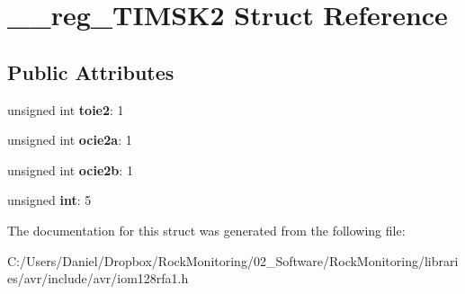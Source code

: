 \hypertarget{struct____reg___t_i_m_s_k2}{}\section{\+\_\+\+\_\+reg\+\_\+\+T\+I\+M\+S\+K2 Struct Reference}
\label{struct____reg___t_i_m_s_k2}
\subsection*{Public Attributes}
\begin{DoxyCompactItemize}
\item 
unsigned int {\bfseries toie2}\+: 1\hypertarget{struct____reg___t_i_m_s_k2_a2cab9bd45bbdc8185ae7580166240124}{}\label{struct____reg___t_i_m_s_k2_a2cab9bd45bbdc8185ae7580166240124}

\item 
unsigned int {\bfseries ocie2a}\+: 1\hypertarget{struct____reg___t_i_m_s_k2_ab5078ad6c4f52deadc17a3c3cb8931c6}{}\label{struct____reg___t_i_m_s_k2_ab5078ad6c4f52deadc17a3c3cb8931c6}

\item 
unsigned int {\bfseries ocie2b}\+: 1\hypertarget{struct____reg___t_i_m_s_k2_af2c60271b7ecfbdf2bb1e586bf2a39fe}{}\label{struct____reg___t_i_m_s_k2_af2c60271b7ecfbdf2bb1e586bf2a39fe}

\item 
unsigned {\bfseries int}\+: 5\hypertarget{struct____reg___t_i_m_s_k2_a6f25c436e301b592015f622d9099facb}{}\label{struct____reg___t_i_m_s_k2_a6f25c436e301b592015f622d9099facb}

\end{DoxyCompactItemize}


The documentation for this struct was generated from the following file\+:\begin{DoxyCompactItemize}
\item 
C\+:/\+Users/\+Daniel/\+Dropbox/\+Rock\+Monitoring/02\+\_\+\+Software/\+Rock\+Monitoring/libraries/avr/include/avr/iom128rfa1.\+h\end{DoxyCompactItemize}
